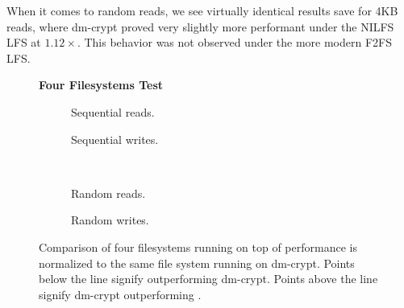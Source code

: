 When it comes to random reads, we see virtually identical results save for 4KB
reads, where dm-crypt proved very slightly more performant under the NILFS
LFS at $1.12\times$. This behavior was not observed under the more modern F2FS
LFS.



\begin{figure*}[t]
    \textbf{\SYSTEM{} Four Filesystems Test}\par\medskip
    \centering
    \begin{subfigure}{0.5\linewidth}
        \centering
        {}
        \caption{Sequential reads.}
        \label{fig:microbench-gamut-sequential-r}
    \end{subfigure}\hspace*{0.5em}%
    \begin{subfigure}{0.5\linewidth}
        \centering
        {}
        \caption{Sequential writes.}
        \label{fig:microbench-gamut-sequential-w}
    \end{subfigure}\\[1ex]
    \hspace*{-0.9em}%
    \begin{subfigure}{0.5\linewidth}
        \vspace{0.5em}
        \centering
        {}
        \caption{Random reads.}
        \label{fig:microbench-gamut-random-r}
    \end{subfigure}%
    \begin{subfigure}{0.5\linewidth}
        \centering
        {}
        \caption{Random writes.}
        \label{fig:microbench-gamut-random-w}
    \end{subfigure}
    \caption{Comparison of four filesystems running on top of
      \SYSTEM{} performance is normalized to the same file system
      running on dm-crypt.  Points below the line signify \SYSTEM{}
      outperforming dm-crypt. Points above the line signify dm-crypt
      outperforming \SYSTEM{}.}
    \label{fig:microbench-gamut}
\end{figure*}


